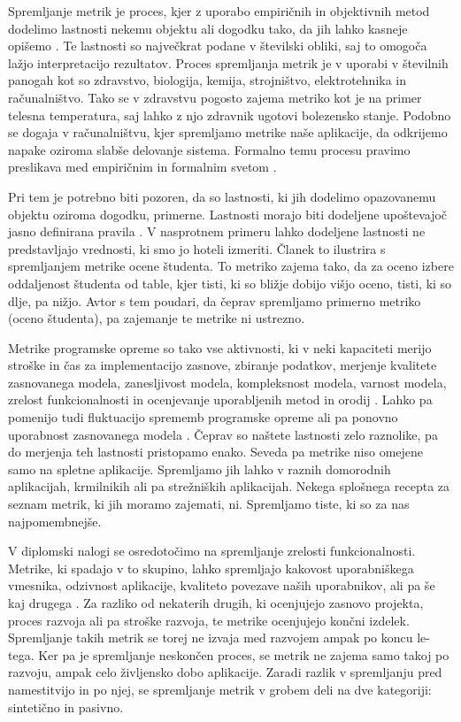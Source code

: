 \documentclass[a4paper, 12pt]{book}
\begin{document}
Spremljanje metrik je proces, kjer z uporabo empiričnih in objektivnih metod dodelimo lastnosti nekemu objektu ali dogodku tako, da jih lahko kasneje opišemo \cite{se_metrics}. Te lastnosti so največkrat podane v številski obliki, saj to omogoča lažjo interpretacijo rezultatov. Proces spremljanja metrik je v uporabi v številnih panogah kot so zdravstvo, biologija, kemija, strojništvo, elektrotehnika in računalništvo. Tako se v zdravstvu pogosto zajema metriko kot je na primer telesna temperatura, saj lahko z njo zdravnik ugotovi bolezensko stanje. Podobno se dogaja v računalništvu, kjer spremljamo metrike naše aplikacije, da odkrijemo napake oziroma slabše delovanje sistema. Formalno temu procesu pravimo preslikava med empiričnim in formalnim svetom \cite{se_metrics}.

Pri tem je potrebno biti pozoren, da so lastnosti, ki jih dodelimo opazovanemu objektu oziroma dogodku, primerne. Lastnosti morajo biti dodeljene upoštevajoč jasno definirana pravila \cite{software_metrics}. V nasprotnem primeru lahko dodeljene lastnosti ne predstavljajo vrednosti, ki smo jo hoteli izmeriti. Članek \cite{se_metrics} to ilustrira s spremljanjem metrike ocene študenta. To metriko zajema tako, da za oceno izbere oddaljenost študenta od table, kjer tisti, ki so bližje dobijo višjo oceno, tisti, ki so dlje, pa nižjo. Avtor s tem poudari, da čeprav spremljamo primerno metriko (oceno študenta), pa zajemanje te metrike ni ustrezno.

Metrike programske opreme so tako vse aktivnosti, ki v neki kapaciteti merijo stroške in čas za implementacijo zasnove, zbiranje podatkov, merjenje kvalitete zasnovanega modela, zanesljivost modela, kompleksnost modela, varnost modela, zrelost funkcionalnosti in ocenjevanje uporabljenih metod in orodij \cite{software_metrics} \cite{usefulness_soft_metrics} \cite{assigning_weights_quality} \cite{fault_prediction_metrics}. Lahko pa pomenijo tudi fluktuacijo sprememb programske opreme ali pa ponovno uporabnost zasnovanega modela \cite{metrics_fluctuation} \cite{reusability_metrics}. Čeprav so naštete lastnosti zelo raznolike, pa do merjenja teh lastnosti pristopamo enako. Seveda pa metrike niso omejene samo na spletne aplikacije. Spremljamo jih lahko v raznih domorodnih aplikacijah, krmilnikih ali pa strežniških aplikacijah. Nekega splošnega recepta za seznam metrik, ki jih moramo zajemati, ni. Spremljamo tiste, ki so za nas najpomembnejše.

V diplomski nalogi se osredotočimo na spremljanje zrelosti funkcionalnosti. Metrike, ki spadajo v to skupino, lahko spremljajo kakovost uporabniškega vmesnika, odzivnost aplikacije, kvaliteto povezave naših uporabnikov, ali pa še kaj drugega \cite{wba_quality}. Za razliko od nekaterih drugih, ki ocenjujejo zasnovo projekta, proces razvoja ali pa stroške razvoja, te metrike ocenjujejo končni izdelek. Spremljanje takih metrik se torej ne izvaja med razvojem ampak po koncu le-tega. Ker pa je spremljanje neskončen proces, se metrik ne zajema samo takoj po razvoju, ampak celo življensko dobo aplikacije. Zaradi razlik v spremljanju pred namestitvijo in po njej, se spremljanje metrik v grobem deli na dve kategoriji: sintetično in pasivno.
\end{document}
